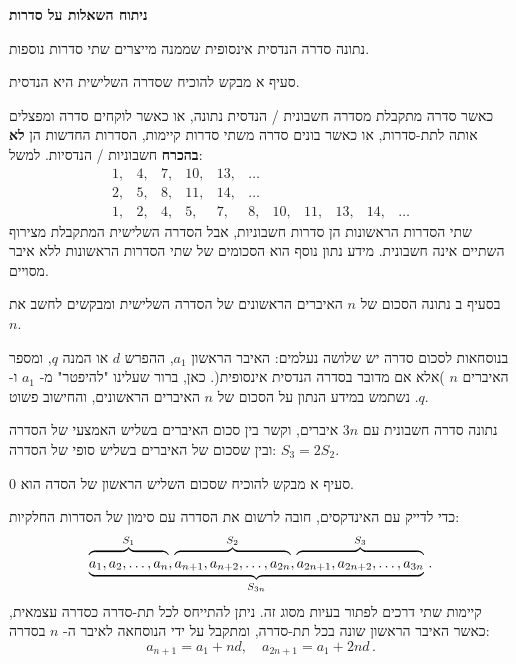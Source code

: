 \documentclass[12pt,a4paper]{article}
\begin{document}

\begin{center}
\textbf{ניתוח השאלות על סדרות}
\end{center}

\textbf{}
נתונה סדרה הנדסית אינסופית שממנה מייצרים שתי סדרות נוספות.

סעיף א מבקש להוכיח שסדרה השלישית היא הנדסית. 

כאשר סדרה מתקבלת מסדרה חשבונית / הנדסית נתונה, או כאשר לוקחים סדרה ומפצלים אותה לתת-סדרות, או כאשר בונים סדרה משתי סדרות קיימות, הסדרות החדשות הן
\textbf{לא בהכרח}
חשבוניות / הנדסיות. למשל:
\[
\begin{array}{rrrrrrrrrrr}
1,& 4,& 7,& 10,& 13,& \ldots\\
2,& 5,& 8,& 11,& 14, &\ldots\\
1,& 2,& 4,& 5,& 7,& 8,& 10,& 11,& 13,& 14, &\ldots
\end{array}
\]
שתי הסדרות הראשונות הן סדרות חשבוניות, אבל הסדרה השלישית המתקבלת מצירוף השתיים אינה חשבונית. מידע נתון נוסף הוא הסכומים של שתי הסדרות הראשונות ללא איבר מסויים.

בסעיף ב נתונה הסכום של
$n$
האיברים הראשונים של הסדרה השלישית ומבקשים לחשב את 
$n$.

בנוסחאות לסכום סדרה יש שלושה נעלמים: האיבר הראשון
$a_1$,
ההפרש
$d$
או המנה
$q$,
ומספר האיברים
$n$
)אלא אם מדובר בסדרה הנדסית אינסופית(. 
כאן, ברור שעלינו "להיפטר" מ-%
$a_1$
ו-
$q$.
נשתמש במידע הנתון על הסכום של
$n$
האיברים הראשונים, והחישוב פשוט.

\bigskip

\textbf{}
נתונה סדרה חשבונית עם
$3n$
איברים, וקשר בין סכום האיברים בשליש האמצעי של הסדרה ובין שסכום של האיברים בשליש סופי של הסדרה:
$S_3 = 2S_2$.

סעיף א מבקש להוכיח שסכום השליש הראשון של הסדה הוא 0.

כדי לדייק עם האינדקסים, חובה לרשום את הסדרה עם סימון של הסדרות החלקיות:
\[
\underbrace{
\overbrace{\rule{0pt}{8pt}a_1, a_2, \ldots, a_n}^{S_1},
\overbrace{\rule{0pt}{8pt}a_{n+1}, a_{n+2}, \ldots, a_{2n}}^{S_2},
\overbrace{\rule{0pt}{8pt}a_{2n+1}, a_{2n+2}, \ldots, a_{3n}}^{S_3}
}_{S_{3n}}\,.
\]
קיימות שתי דרכים לפתור בעיות מסוג זה. ניתן להתייחס לכל תת-סדרה כסדרה עצמאית, כאשר האיבר הראשון שונה בכל תת-סדרה, ומתקבל על ידי הנוסחאה לאיבר ה-%
$n$
בסדרה:
\[
a_{n+1} = a_1 + nd, \quad a_{2n+1} = a_1 + 2nd\,.
\]
\end{document}
